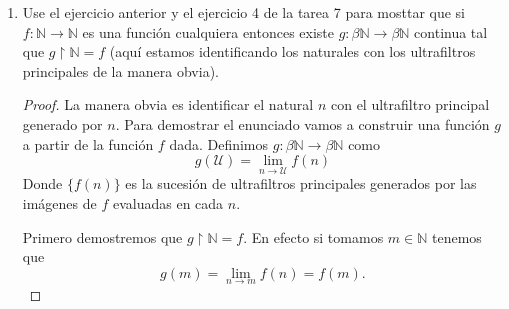 \documentclass[letter,twoside,12pt]{article}
\begin{document}
\begin{enumerate}
\begin{proof}
Sea $ P $ el conjunto de los filtros que contienen a $  \{X_i\} $. $ P $ no es vacío, pues por un teorema demostrado e la tarea 6 existe un filtro generado por $  \{X_i\} $ que contiene a $  \{X_i\} $. Ahora si tomamos $ T $ una cadena de elementos en $ P $ entonces tenemos que $M = \bigcup_{F \in T} F $ es una cota superior de esta cadena. En primer lugar, como el vacío no se encuentra en ninguno de los elementos de la cadena, no se encuentra en la unión. Por otra parte si $ A, B \in M $ entonces existe $ F_1 $ y $ F_2  \in T$ tales que $ A \in F_1 $ y $ B \in F_2 $ si suponemos sin pérdida de generalidad que $ F_1 \subseteq F_2 $ entonces $ A \in F_2 $. Por lo tanto como $ F_2 $ es un filtro tenemos que $ A \cap B \in F_2 \subseteq M$. Además si $C$ es tal que para algún elemento $ A \in M $ $ A \subseteq C $, entonces como $ A \in F $ para algún $ F \in T $ tenemos que $ C \in T $ por lo que $ C \in M $. Por lo tanto es un filtro. Además contiene  a $  \{X_i\} $ porque todos los filtros de $ T $ lo contienen.
Luego por el Lema de Zorn existe un filtro máximal $ \mathcal{U} $ que contiene a $ \{X_i\}_{i \in I} $ y en la tarea anterior se demostró que un filtro máximal es un ultrafiltro.

\end{proof}

\item Use el ejercicio anterior y el ejercicio 4 de la tarea 7 para mosttar que si $ f : \mathbb{N} \to \mathbb{N} $ es una función cualquiera entonces existe $ g : \beta\mathbb{N} \to \beta\mathbb{N} $ continua tal que $ g \upharpoonright \mathbb{N} = f $ (aquí estamos identificando los naturales con los ultrafiltros principales de la manera obvia).

\begin{proof}
La manera obvia es identificar el natural $ n $ con el ultrafiltro principal generado por $ n $. Para demostrar el enunciado vamos a construir una función $ g $ a partir de la función $ f $ dada. Definimos $ g : \beta\mathbb{N} \to \beta\mathbb{N} $ como \begin{equation}
g(\mathcal{U}) = \lim_{n \to \mathcal{U}} f(n) \nonumber
\end{equation}
Donde $ \{f(n)\} $ es la sucesión de ultrafiltros principales generados por las imágenes de $ f $ evaluadas en cada $ n $.

Primero demostremos que $ g \upharpoonright \mathbb{N} = f $. En efecto si tomamos $ m \in \mathbb{N} $ tenemos que
\begin{equation}
g(m) =  \lim_{n \to m} f(n) = f(m). \nonumber
\end{equation}


\end{proof}
\end{enumerate}
\end{document}
